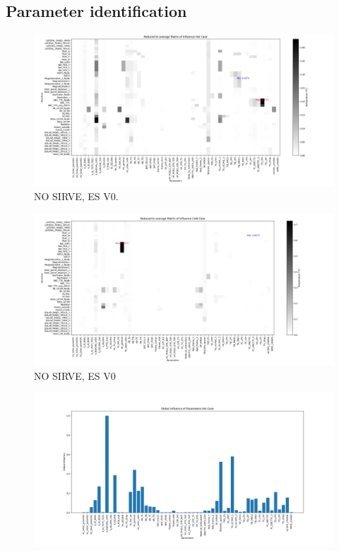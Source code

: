 \begin{itemize}
\subsection{Parameter identification}
\begin{figure}[H]
	\centering
	\includegraphics[width=\textwidth]{Figures/figs_malas/infmatHot_redAverage.png}
	\caption{NO SIRVE, ES V0.}
	\label{fig:fm1}
\end{figure}
\begin{figure}[H]
	\centering
	\includegraphics[width=\textwidth]{Figures/figs_malas/infmatCold_redAverage.png}
	\caption{NO SIRVE, ES V0}
	\label{fig:fm2}
\end{figure}
\begin{figure}[H]
	\centering
	\includegraphics[width=\textwidth]{Figures/figs_malas/infGlobalHot.png}

\end{figure}
\end{itemize}

